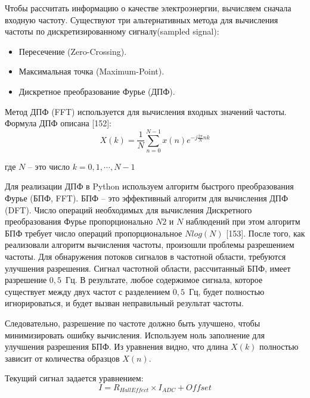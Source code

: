 Чтобы рассчитать информацию о качестве электроэнергии, вычисляем сначала входную частоту. Существуют три альтернативных метода для вычисления частоты по дискретизированному сигналу(sampled signal):
\begin{itemize}
	\item Пересечение (Zero-Crossing).
	\item Максимальная точка (Maximum-Point).
	\item Дискретное преобразование Фурье (ДПФ).
\end{itemize}
Метод ДПФ (FFT) используется для вычисления входных значений частоты. Формула ДПФ описана [152]:
\begin{equation}
\label{eq:equation1}
X(k) = \frac{1}{N} \sum\limits_{n=0}^{N-1} x(n)e^{-j\frac{2 \pi}{N}nk}
\end{equation}

где $N$ -- это число $k = 0, 1, \cdots, N-1$

Для реализации ДПФ в Python используем алгоритм быстрого преобразования Фурье (БПФ, FFT). БПФ -- это эффективный алгоритм для вычисления ДПФ (DFT). Число операций необходимых для вычисления Дискретного преобразования Фурье пропорционально $N2$ и $N$ наблюдений при этом алгоритм БПФ требует число операций пропорциональное $Nlog(N)$ [153].
После того, как реализовали алгоритм вычисления частоты, произошли проблемы разрешением частоты. Для обнаружения потоков сигналов в частотной области,  требуются улучшения разрешения. Сигнал частотной области, рассчитанный БПФ, имеет разрешение $0,5$~Гц. В результате, любое содержимое сигнала, которое существует между двух частот  с разделением $0,5$~Гц, будет полностью игнорироваться, и будет вызван неправильный результат частоты.

Следовательно, разрешение по частоте должно быть улучшено, чтобы минимизировать ошибку вычисления. Используем ноль заполнение для улучшения разрешения БПФ. Из уравнения видно, что длина $X(k)$ полностью зависит от количества образцов $X (n)$.

Текущий сигнал задается уравнением:
\begin{equation}
\label{eq:equation2}
I = R_{HallEffect} \times  I_{ADC} + Offset
\end{equation}

